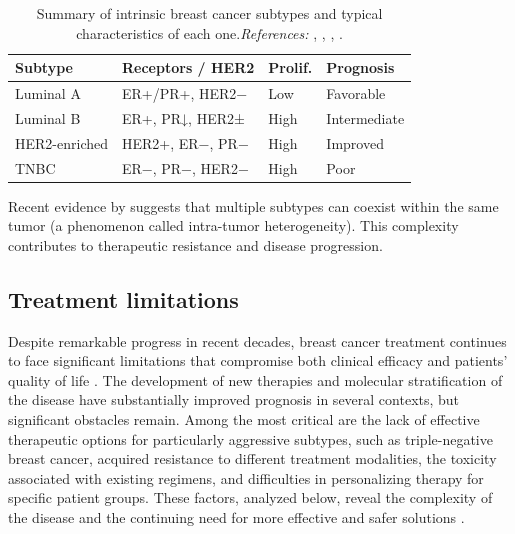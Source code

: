 \renewcommand{\arraystretch}{1.3}
\begin{table}
  \centering
  \small
  \caption{Summary of intrinsic breast cancer subtypes and typical characteristics of each one.\newline\textit{References:} \cite{clinical_implication_bca_Adamo2015}, \cite{diff_bca_usa_Howlader2018}, \cite{clinical_implication_bca_Adamo2015}, \cite{updatedbca_Hong2022Breast}.}
  \label{tab:bc_subtypes_summary}
  \begin{tabular}{llll}
    \toprule
    \textbf{Subtype}  & \textbf{Receptors / HER2} & \textbf{Prolif.} & \textbf{Prognosis} \\
    \midrule
    Luminal A         & ER+/PR+, HER2−            & Low              & Favorable          \\
    Luminal B         & ER+, PR↓, HER2±           & High             & Intermediate       \\
    HER2-enriched     & HER2+, ER−, PR−           & High             & Improved           \\
    TNBC              & ER−, PR−, HER2−           & High             & Poor               \\
    \bottomrule
  \end{tabular}

  \vspace{1ex}
  \raggedright
  \footnotesize
\end{table}

Recent evidence by
\textcite{intratumor_heterogeneity_Yeo2017,origins_and_evolution_bca_Polyak2007}
suggests that multiple subtypes can coexist within the same tumor (a phenomenon
called intra-tumor heterogeneity). This complexity contributes to therapeutic
resistance and disease progression.

\subsection{Treatment limitations}

Despite remarkable progress in recent decades, breast cancer treatment
continues to face significant limitations that compromise both clinical
efficacy and patients' quality of life \cite{Loibl2021Breast}. The development
of new therapies and molecular stratification of the disease have substantially
improved prognosis in several contexts, but significant obstacles remain. Among
the most critical are the lack of effective therapeutic options for
particularly aggressive subtypes, such as triple-negative breast cancer,
acquired resistance to different treatment modalities, the toxicity associated
with existing regimens, and difficulties in personalizing therapy for specific
patient groups. These factors, analyzed below, reveal the complexity of the
disease and the continuing need for more effective and safer solutions
\cite{bc_molecular_Perou2000, clinical_implication_bca_Adamo2015}.


